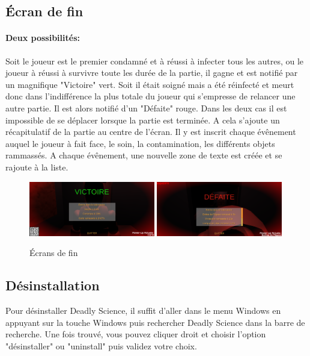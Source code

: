 \documentclass{article}
\begin{document}
\subsection{Écran de fin}
\paragraph{Deux possibilités:}
Soit le joueur est le premier condamné et à réussi à infecter tous les autres, ou le joueur à réussi à survivre toute les durée de la partie, il gagne et est notifié par un magnifique "Victoire" vert. Soit il était soigné mais a été réinfecté et meurt donc dans l'indifférence la plus totale du joueur qui s'empresse de relancer une autre partie. Il est alors notifié d'un "Défaite" rouge. Dans les deux cas il est impossible de se déplacer lorsque la partie est terminée. A cela s'ajoute un récapitulatif de la partie au centre de l'écran. Il y est inscrit chaque évênement auquel le joueur à fait face, le soin, la contamination, les différents objets rammassés. A chaque évênement, une nouvelle zone de texte est créée et se rajoute à la liste.

\begin{figure}[H]
	\centering
	\includegraphics[width=0.49\textwidth]{Victoire.png}
	\includegraphics[width=0.49\textwidth]{Defaite.png}
	\caption{Écrans de fin}
	\label{Écrans de fin}
\end{figure}


\newpage
\subsection{Désinstallation}

Pour désinstaller Deadly Science, il suffit d'aller dans le menu Windows en appuyant sur la touche Windows puis rechercher Deadly Science dans la barre de recherche.
Une fois trouvé, vous pouvez cliquer droit et choisir l'option "désinstaller" ou "uninstall" puis validez votre choix. 
\end{document}

